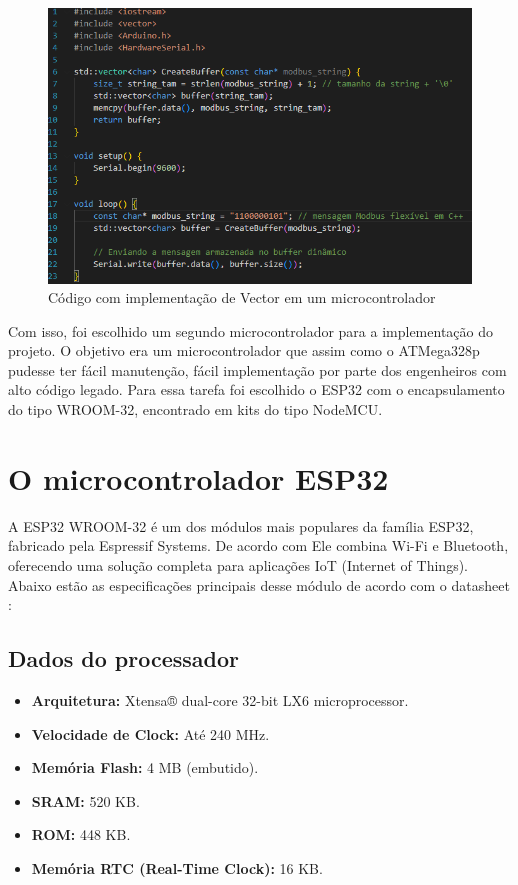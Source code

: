 \begin{figure}[h]
	\centering
	\label{fig:vector}
		\includegraphics[keepaspectratio=true,scale=0.6]{figuras/vector.png}
	\caption{Código com implementação de Vector em um microcontrolador}
\end{figure}


Com isso, foi escolhido um segundo microcontrolador para a implementação do projeto. O objetivo era um microcontrolador que assim como o ATMega328p pudesse ter fácil manutenção, fácil implementação por parte dos engenheiros com alto código legado. Para essa tarefa foi escolhido o ESP32 com o encapsulamento do tipo WROOM-32, encontrado em kits do tipo NodeMCU. 

\section{O microcontrolador ESP32}

A ESP32 WROOM-32 é um dos módulos mais populares da família ESP32, fabricado pela Espressif Systems. De acordo com \cite{esp32_manual} Ele combina Wi-Fi e Bluetooth, oferecendo uma solução completa para aplicações IoT (Internet of Things). Abaixo estão as especificações principais desse módulo de acordo com o datasheet \cite{esp32_manual}:

\subsection{Dados do processador}
\begin{itemize}
    \item \textbf{Arquitetura:} Xtensa® dual-core 32-bit LX6 microprocessor.
    \item \textbf{Velocidade de Clock:} Até 240 MHz.
    \item \textbf{Memória Flash:} 4 MB (embutido).
    \item \textbf{SRAM:} 520 KB.
    \item \textbf{ROM:} 448 KB.
    \item \textbf{Memória RTC (Real-Time Clock):} 16 KB.
\end{itemize}

